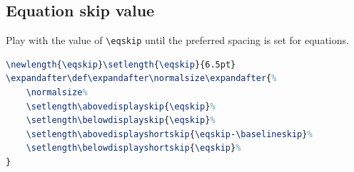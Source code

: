 \documentclass[9pt,a4paper,twoside]{tau}
\begin{document}
    \subsection{Equation skip value}

        Play with the value of \verb|\eqskip| until the preferred spacing is set for equations.

\begin{lstlisting}[language=TeX, caption=Equation skip code.]
\newlength{\eqskip}\setlength{\eqskip}{6.5pt}
\expandafter\def\expandafter\normalsize\expandafter{%
    \normalsize%
    \setlength\abovedisplayskip{\eqskip}%
    \setlength\belowdisplayskip{\eqskip}%
    \setlength\abovedisplayshortskip{\eqskip-\baselineskip}%
    \setlength\belowdisplayshortskip{\eqskip}%
}
\end{lstlisting}
					

\printbibliography



\end{document}
